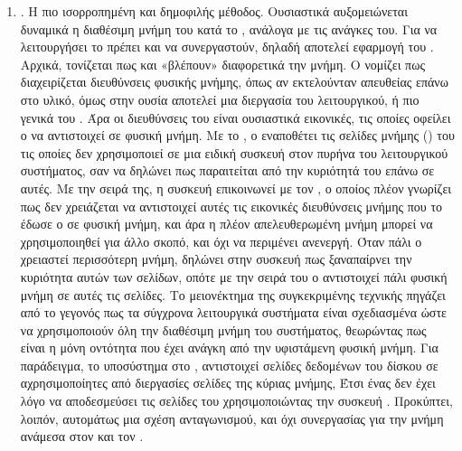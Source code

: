 \begin{enumerate}
  \item {}. Η πιο ισορροπημένη και δημοφιλής μέθοδος.
  Ουσιαστικά αυξομειώνεται δυναμικά η διαθέσιμη μνήμη του 
  κατά το , ανάλογα με τις ανάγκες του. Για να λειτουργήσει
  το  πρέπει  και  να συνεργαστούν, δηλαδή
  αποτελεί εφαρμογή του . Αρχικά, τονίζεται πως
    και  «βλέπουν» διαφορετικά την μνήμη. Ο  νομίζει
   πως διαχειρίζεται διευθύνσεις φυσικής μνήμης, όπως αν
   εκτελούνταν απευθείας επάνω στο υλικό, όμως στην ουσία αποτελεί
   μια διεργασία του  λειτουργικού, ή πιο γενικά του
   . Άρα οι διευθύνσεις του είναι ουσιαστικά εικονικές,
   τις οποίες οφείλει ο  να αντιστοιχεί σε φυσική μνήμη.
   Με το , ο  εναποθέτει τις σελίδες μνήμης
   () του τις οποίες δεν χρησιμοποιεί σε μια ειδική
   συσκευή στον πυρήνα του λειτουργικού συστήματος, σαν να
   δηλώνει πως παραιτείται από την κυριότητά του επάνω σε αυτές.
   Με την σειρά της, η συσκευή επικοινωνεί  με τον ,
   ο οποίος πλέον γνωρίζει πως δεν χρειάζεται να αντιστοιχεί
   αυτές τις εικονικές διευθύνσεις μνήμης που το έδωσε ο 
   σε φυσική μνήμη, και άρα η πλέον απελευθερωμένη μνήμη μπορεί
   να χρησιμοποιηθεί για άλλο σκοπό, και όχι να περιμένει
   ανενεργή. Όταν πάλι ο  χρειαστεί περισσότερη μνήμη,
   δηλώνει στην συσκευή πως ξαναπαίρνει την κυριότητα αυτών
   των σελίδων, οπότε με την σειρά του ο  αντιστοιχεί
   πάλι φυσική μνήμη σε αυτές τις σελίδες. Το μειονέκτημα
   της συγκεκριμένης τεχνικής πηγάζει από το γεγονός πως τα σύγχρονα λειτουργικά συστήματα είναι σχεδιασμένα
   ώστε να χρησιμοποιούν όλη την διαθέσιμη μνήμη του συστήματος,
   θεωρώντας πως είναι η μόνη οντότητα που έχει ανάγκη από
   την υφιστάμενη φυσική μνήμη. Για παράδειγμα, το 
   υποσύστημα στο , αντιστοιχεί σελίδες δεδομένων του
   δίσκου σε αχρησιμοποίητες από διεργασίες σελίδες της κύριας
   μνήμης, Έτσι ένας  δεν έχει λόγο να αποδεσμεύσει τις
   σελίδες του χρησιμοποιώντας την συσκευή .
   Προκύπτει, λοιπόν, αυτομάτως μια σχέση ανταγωνισμού, και όχι συνεργασίας
   για την μνήμη ανάμεσα στον  και τον \cite{paperAimiliou}.


\end{enumerate}




\subsection{}

